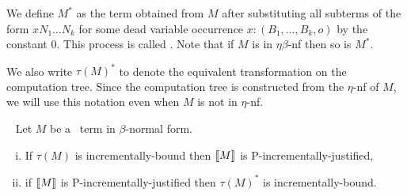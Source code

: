 We define $M^*$ as the term obtained from $M$ after substituting all subterms of the form  $x N_1 \dots N_k$ for some dead variable occurrence $x:(B_1,\ldots, B_k, o)$ by the constant $0$. This process is called .
Note that if $M$ is in $\eta\beta$-nf then so is $M^*$.

We also write $\tau(M)^*$ to denote the equivalent transformation on the computation tree. Since the computation tree is constructed from the $\eta$-nf of $M$, we will use this notation even when $M$ is not in $\eta$-nf.



\begin{proposition} \
\label{prop:incrbound_imp_incrjustified_pcf} Let $M$ be a \pcf\ term in $\beta$-normal form.
\begin{enumerate}[(i)]
\item  If $\tau(M)$ is incrementally-bound then ${[\![ M ]\!]}$ is P-incrementally-justified,
\item  if ${[\![ M ]\!]}$ is P-incrementally-justified
then $\tau(M)^*$ is incrementally-bound.
\end{enumerate}
\end{proposition}
